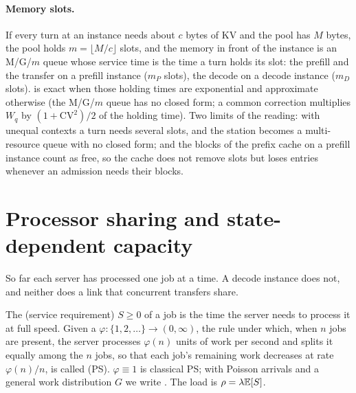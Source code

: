 \paragraph{Memory slots.} If every turn at an instance needs about $c$ bytes of KV and
the pool has $M$ bytes, the pool holds $m=\lfloor M/c\rfloor$ slots, and the memory in
front of the instance is an M/G/$m$ queue whose service time is the time a turn holds
its slot: the prefill and the transfer on a prefill instance ($m_P$ slots), the decode
on a decode instance ($m_D$ slots).  is exact when those holding times
are exponential and approximate otherwise (the M/G/$m$ queue has no closed form; a
common correction multiplies $W_q$ by $(1+\mathrm{CV}^2)/2$ of the holding time). Two
limits of the reading: with unequal contexts a turn needs several slots, and the
station becomes a multi-resource queue with no closed form; and the blocks of the
prefix cache on a prefill instance count as free, so the cache does not remove slots
but loses entries whenever an admission needs their blocks.

\section{Processor sharing and state-dependent capacity}

So far each server has processed one job at a time. A decode instance does not, and
neither does a link that concurrent transfers share.

\begin{definition}\label{def:ps}
The  (service requirement) $S\ge0$ of a job is the time the server needs to
process it at full speed.
Given a  $\varphi:\{1,2,\dots\}\to(0,\infty)$, the rule under
which, when $n$ jobs are present, the server processes $\varphi(n)$ units of work per
second and splits it equally among the $n$ jobs, so that each job's remaining work
decreases at rate $\varphi(n)/n$, is called  (PS).
$\varphi\equiv1$ is classical PS; with Poisson arrivals and a general work distribution
$G$ we write . The load is $\rho=\lambda\mathbb{E}[S]$.
\end{definition}


